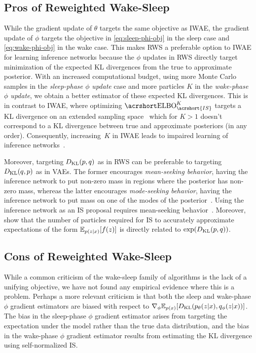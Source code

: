 \subsection{Pros of Reweighted Wake-Sleep}

While the gradient update of $\theta$ targets the same objective as \gls{IWAE}, the gradient update of $\phi$ targets the objective in \cref{eq:sleep-phi-obj} in the sleep case and \cref{eq:wake-phi-obj} in the wake case.
This makes \gls{RWS} a preferable option to \gls{IWAE} for learning inference networks because
the $\phi$ updates in \gls{RWS} directly target minimization of the expected \gls{KL} divergences from the true to approximate posterior.
%
With an increased computational budget, using more Monte Carlo samples in the \emph{sleep-phase $\phi$ update} case and more particles $K$ in the \emph{wake-phase $\phi$ update}, we obtain a better estimator of these expected \gls{KL} divergences.
%
This is in contrast to \gls{IWAE}, where optimizing $\ELBO_{\acrshort{IS}}^K$ targets a \gls{KL} divergence on an extended sampling space~\citep{Le2018autoencoding} which for $K > 1$ doesn't correspond to a \gls{KL} divergence between true and approximate posteriors (in any order).
%
Consequently, increasing~\(K\) in \gls{IWAE} leads to impaired learning of inference networks~\citep{Rainforth2018tighter}.

Moreover, targeting $D_{\mathrm{KL}}(p, q)$ as in \gls{RWS} can be preferable to targeting $D_{\mathrm{KL}}(q, p)$ as in \glspl{VAE}.
%
The former encourages \emph{mean-seeking behavior}, having the inference network to put non-zero mass in regions where the posterior has non-zero mass, whereas the latter encourages \emph{mode-seeking behavior}, having the inference network to put mass on one of the modes of the posterior~\citep{Minka2005divergence}.
%
Using the inference network as an \gls{IS} proposal requires mean-seeking behavior~\citep[Theorem 9.2]{owen2013monte}.
%
Moreover, \citet{Chatterjee2018sample} show that the number of particles required for \gls{IS} to accurately approximate expectations of the form $\mathbb{E}_{p(z \lvert x)}[f(z)]$ is directly related to $\exp(D_{\mathrm{KL}}(p, q))$.

\subsection{Cons of Reweighted Wake-Sleep}
\label{sec:disadvantages}

While a common criticism of the wake-sleep family of algorithms is the lack of a unifying objective, we have not found any empirical evidence where this is a problem.
%
Perhaps a more relevant criticism is that both the sleep and wake-phase $\phi$ gradient estimators are biased with respect to $\nabla_\phi \mathbb{E}_{p(x)}[D_{\mathrm{KL}}(p_\theta(z \lvert x), q_\phi(z \lvert x))]$.
%
The bias in the sleep-phase $\phi$ gradient estimator arises from targeting the expectation under the model rather than the true data distribution, and the bias in the wake-phase $\phi$ gradient estimator results from estimating the \gls{KL} divergence using self-normalized \gls{IS}.

